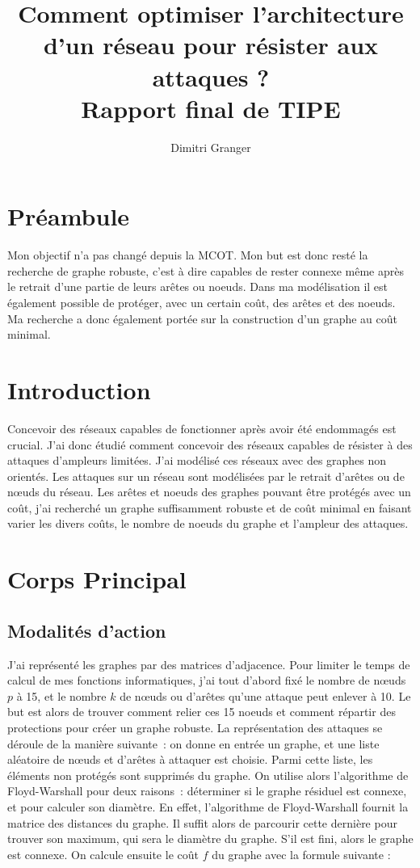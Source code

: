 \documentclass[12pt,a4paper]{article}
\title{Comment optimiser l'architecture d'un réseau pour résister aux attaques ?\\
Rapport final de TIPE}
\author{Dimitri Granger}
\begin{document}
\maketitle

\section{Préambule}
Mon objectif n'a pas changé depuis la MCOT. Mon but est donc resté la recherche de graphe robuste,
c'est à dire capables de rester connexe même après le retrait d'une partie de leurs arêtes ou noeuds. Dans ma 
modélisation il est également possible de protéger, avec un certain coût, des arêtes et des noeuds. Ma recherche a donc également portée sur la construction d'un graphe au coût minimal.

\section{Introduction}

Concevoir des réseaux capables de fonctionner après avoir été endommagés est crucial. J'ai donc étudié comment concevoir des réseaux capables de résister à des attaques d'ampleurs limitées.  J'ai modélisé ces réseaux avec des graphes non orientés. Les attaques sur un réseau sont modélisées par le retrait d'arêtes ou de nœuds du réseau. Les arêtes et noeuds des graphes pouvant être protégés avec un coût, j'ai recherché un graphe suffisamment robuste et de coût minimal en faisant varier les divers coûts, le nombre de noeuds du graphe et l'ampleur des attaques.



\section{Corps Principal}
\subsection{Modalités d'action}


J'ai représenté les graphes par des matrices d'adjacence. Pour limiter le temps de calcul de mes fonctions informatiques, j'ai tout d'abord fixé le nombre de nœuds $p$  à 15, et le nombre $k$ de nœuds ou d'arêtes qu'une attaque peut enlever à 10. Le but est alors de trouver comment relier ces 15 noeuds et comment répartir des protections pour créer un graphe robuste. La représentation des attaques se déroule de la manière suivante : on donne en entrée un graphe, et une liste aléatoire de nœuds et d'arêtes à attaquer est choisie. Parmi cette liste, les éléments non protégés sont supprimés du graphe. On utilise alors l'algorithme de Floyd-Warshall pour deux raisons : déterminer si le graphe résiduel est connexe, et pour calculer son diamètre. En effet, l'algorithme de Floyd-Warshall fournit la matrice des distances du graphe. Il suffit alors de parcourir cette dernière pour trouver son maximum, qui sera le diamètre du graphe. S'il est fini, alors le graphe est connexe. On calcule ensuite le coût $f$ du graphe avec la formule suivante :
\end{document}
